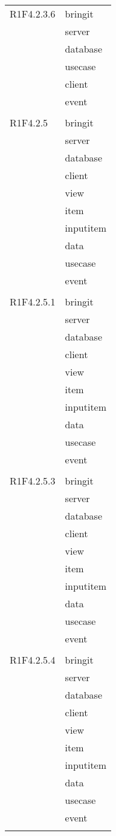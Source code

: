 \begin{center}
\begin{longtable}{|p{7cm}|p{7cm}|}
		R1F4.2.3.6 & bringit \\ & server \\ & database \\ & usecase \\ & client \\ & event \\ & \\ \hline
		R1F4.2.5 & bringit \\ & server \\ & database \\ & client \\ & view \\ & item \\ & inputitem \\ & data \\ & usecase \\ & event \\ & \\ \hline
		R1F4.2.5.1 & bringit \\ & server \\ & database \\ & client \\ & view \\ & item \\ & inputitem \\ & data \\ & usecase \\ & event \\ & \\ \hline
		R1F4.2.5.3 & bringit \\ & server \\ & database \\ & client \\ & view \\ & item \\ & inputitem \\ & data \\ & usecase \\ & event \\ & \\ \hline
		R1F4.2.5.4 & bringit \\ & server \\ & database \\ & client \\ & view \\ & item \\ & inputitem \\ & data \\ & usecase \\ & event \\ & \\ \hline

\end{longtable}
\end{center}
